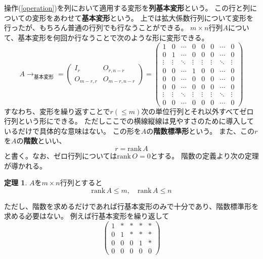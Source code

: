 \documentclass[10pt]{jsreport}
\theoremstyle{definition}%
\newtheorem{thm}{定理}[section]%
\newcommand{\kakko}[1]{\left(#1 \right)} %
\newcommand{\rank}{\mathrm{rank\,}}
\numberwithin{equation}{section}%
\begin{document}
操作(\ref{operation})を列において適用する変形を{\bf 列基本変形}という。
この行と列についての変形をあわせて{\bf 基本変形}という。
上では拡大係数行列について変形を行ったが、もちろん普通の行列でも行なうことができる。
$m\times n$行列$A$について、基本変形を何回か行なうことで次のような形に変形できる。
\begin{equation}
\label{kaisu}  A\to_{\text{基本変形}}=
  \kakko{\begin{array}{c|c} 
I_{r} & O_{r,n-r}\\ \hline
O_{m-r,r} & O_{m-r,n-r}
  \end{array}
  }=
  \kakko{\begin{array}{cccc|cccc} 
    1 & 0 & \cdots & 0 & 0 & 0 & \cdots & 0 \\ 
    0 & 1 & \cdots & 0 & 0 & 0 & \cdots & 0 \\ 
    \vdots & \vdots & \ddots & \vdots & \vdots & \vdots & \ddots & \vdots \\
    0 & 0 & \cdots & 1 & 0 & 0 & \cdots & 0 \\ \hline
    0 & 0 & \cdots & 0 & 0 & 0 & \cdots & 0 \\ 
    0 & 0 & \cdots & 0 & 0 & 0 & \cdots & 0 \\ 
    \vdots & \vdots & \ddots & \vdots & \vdots & \vdots & \ddots & \vdots \\
    0 & 0 & \cdots & 0 & 0 & 0 & \cdots & 0 
  \end{array}}
\end{equation}
すなわち、変形を繰り返すことで$r(\leq m)$次の単位行列とそれ以外すべてゼロ行列という形にできる。
ただしここでの横線縦線は見やすさのために導入しているだけで具体的な意味はない。
この形を$A$の{\bf 階数標準形}という。
また、この$r$を$A$の{\bf 階数}といい、
\begin{equation}
  r = \rank A
\end{equation}
と書く。なお、ゼロ行列については$\rank O=0$とする。
階数の定義より次の定理が導かれる。
\begin{screen}
  \begin{thm}
    $A$を$m\times n$行列とすると
    \begin{equation}
      \rank A\leq m,\quad \rank A\leq n
    \end{equation}
  \end{thm}
\end{screen}
ただし、階数を求めるだけであれば行基本変形のみで十分であり、階数標準形を求める必要はない。
例えば行基本変形を繰り返して
\begin{equation}
\label{rank3}  \begin{pmatrix}
    1 & * & * & * & * \\
    0 & 1 & * & * & * \\
    0 & 0 & 0 & 1 & * \\
    0 & 0 & 0 & 0 & 0
  \end{pmatrix}
\end{equation}
\end{document}
